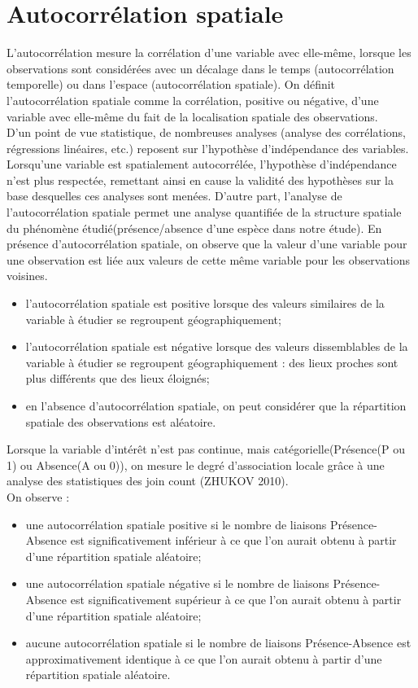 \documentclass[a4paper, oneside, 12pt]{book}
\begin{document}
\chapter{Autocorrélation spatiale}
L’autocorrélation mesure la corrélation d’une variable avec elle-même, lorsque les observations
sont considérées avec un décalage dans le temps (autocorrélation temporelle) ou dans l’espace
(autocorrélation spatiale). On définit l’autocorrélation spatiale comme la corrélation, positive ou
négative, d’une variable avec elle-même du fait de la localisation spatiale des observations. \\
D’un point de vue statistique, de nombreuses analyses (analyse des corrélations, régressions
linéaires, etc.) reposent sur l’hypothèse d’indépendance des variables. Lorsqu’une variable est
spatialement autocorrélée, l’hypothèse d’indépendance n’est plus respectée, remettant ainsi en
cause la validité des hypothèses sur la base desquelles ces analyses sont menées. D’autre part,
l’analyse de l’autocorrélation spatiale permet une analyse quantifiée de la structure spatiale du
phénomène étudié(présence/absence d'une espèce dans notre étude).
En présence d’autocorrélation spatiale, on observe que la valeur d’une variable pour une
observation est liée aux valeurs de cette même variable pour les observations voisines.
\begin{itemize}
	\item l’autocorrélation spatiale est positive lorsque des valeurs similaires de la variable à étudier
	se regroupent géographiquement;
	\item l’autocorrélation spatiale est négative lorsque des valeurs dissemblables de la variable à
	étudier se regroupent géographiquement : des lieux proches sont plus différents que des lieux
	éloignés;
	\item en l’absence d’autocorrélation spatiale, on peut considérer que la répartition spatiale des
	observations est aléatoire.
\end{itemize}
Lorsque la variable d’intérêt n’est pas continue, mais catégorielle(Présence(P ou 1) ou Absence(A ou 0)), on mesure le degré d’association locale grâce à une analyse des statistiques des join count (ZHUKOV 2010).\\
On observe :
\begin{itemize}
	\item une autocorrélation spatiale positive si le nombre de liaisons Présence-Absence est significativement
	inférieur à ce que l’on aurait obtenu à partir d’une répartition spatiale aléatoire;
	\item une autocorrélation spatiale négative si le nombre de liaisons Présence-Absence est significativement supérieur à ce que l’on aurait obtenu à partir d’une répartition spatiale aléatoire;
	\item aucune autocorrélation spatiale si le nombre de liaisons Présence-Absence est approximativement
	identique à ce que l’on aurait obtenu à partir d’une répartition spatiale aléatoire.
\end{itemize}
\end{document}
